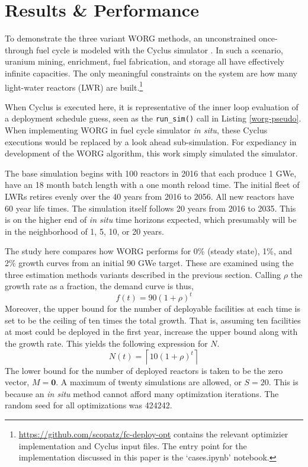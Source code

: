 \section{Results \& Performance}
\label{results}

To demonstrate the three variant WORG methods, an unconstrained
once-through fuel cycle is modeled with the Cyclus simulator
\cite{DBLP:journals/corr/HuffGCFMOSSW15}. In such a scenario, uranium
mining, enrichment, fuel fabrication, and storage all have effectively
infinite capacities. The only meaningful constraints on the system are
how many light-water reactors (LWR) are
built.\footnote{\url{https://github.com/scopatz/fc-deploy-opt}
contains the relevant optimizier implementation and Cyclus input files.
The entry point for the implementation discussed in this paper is the
`cases.ipynb' notebook.}

When Cyclus is executed here, it is representative of the inner loop
evaluation of a deployment schedule guess, seen as the \texttt{run\_sim()}
call in Listing \ref{worg-pseudo}. When implementing WORG in fuel cycle
simulator \emph{in situ}, these Cyclus executions would be replaced by
a look ahead sub-simulation. For expediancy in development of the WORG
algorithm, this work simply simulated the simulator.

The base simulation begins with 100 reactors in 2016 that each produce
1 GWe, have an 18 month batch length with a one month reload time.
The initial fleet of LWRs retires evenly over the 40 years from 2016 to
2056. All new reactors have 60 year life times.  The simulation itself
follows 20 years from 2016 to 2035. This is on the higher end of
\emph{in situ} time horizons expected, which presumably
will be in the neighborhood of 1, 5, 10, or 20 years.

The study here compares how WORG performs for 0\% (steady state), 1\%,
and 2\% growth curves from an initial 90 GWe target. These are examined
using the three estimation methods variants described in the previous section.
Calling $\rho$ the growth rate as a
fraction, the demand curve is thus,
\begin{equation}
\label{f-rate}
f(t) = 90 (1 + \rho)^t
\end{equation}
Moreover, the upper bound for the number of deployable facilities at
each time is set to be the ceiling of ten times the total growth.
That is, assuming ten facilities at most could be deployed in the first
year, increase the upper bound along with the growth rate.  This yields
the following expression for $N$.
\begin{equation}
\label{n-rate}
N(t) = \left\lceil 10 (1 + \rho)^t\right\rceil
\end{equation}
The lower bound for the number of deployed reactors is taken to be the
zero vector, $M = \mathbf{0}$.  A maximum of twenty simulations are allowed,
or $S = 20$.
This is because an \emph{in situ} method cannot afford many optimization
iterations. The random seed for all optimizations was 424242.

